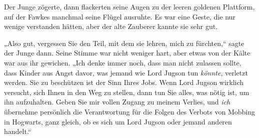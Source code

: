 Der Junge zögerte, dann flackerten seine Augen zu der leeren goldenen Plattform, auf der Fawkes manchmal seine Flügel ausruhte. Es war eine Geste, die nur wenige verstanden hätten, aber der alte Zauberer kannte sie sehr gut.

„Also gut, vergessen Sie den Teil, mit dem sie lehren, mich zu fürchten,“ sagte der Junge dann. Seine Stimme war nicht weniger hart, aber etwas von der Kälte war aus ihr gewichen. „Ich denke immer noch, dass man nicht zulassen sollte, dass Kinder aus Angst davor, was jemand wie Lord Jugson tun \emph{könnte}, verletzt werden. Sie zu beschützen ist der Sinn Ihres Jobs. Wenn Lord Jugson wirklich versucht, sich Ihnen in den Weg zu stellen, dann tun Sie alles, was nötig ist, um ihn aufzuhalten. Geben Sie mir vollen Zugang zu meinem Verlies, und \emph{ich} übernehme persönlich die Verantwortung für die Folgen des Verbots von Mobbing in Hogwarts, ganz gleich, ob es sich um Lord Jugson oder jemand anderen handelt.“

